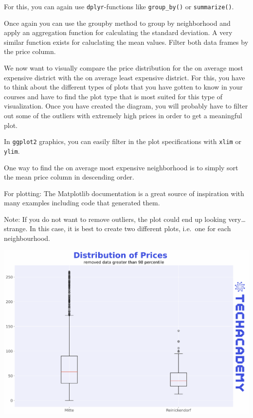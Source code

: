 \documentclass[
  11pt,
]{article}
\newenvironment{tips}[1]
  {
  \begin{itemize}
  \footnotesize
  \renewcommand{\labelitemi}{
    \raisebox{-.7\height}[0pt][0pt]{
      {\setkeys{Gin}{width=3em,keepaspectratio}
        \texttt{[image: images/\#1.png]}}
    }
  }
  \setlength{\fboxsep}{1em}
  \begin{rbox}
  \item
  }
  {
  \end{rbox}
  \end{itemize}
  }
\newenvironment{tipsp}[1]
  {
  \begin{itemize}
  \footnotesize
  \renewcommand{\labelitemi}{
    \raisebox{-.7\height}[0pt][0pt]{
      {\setkeys{Gin}{width=3em,keepaspectratio}
        \texttt{[image: images/\#1.png]}}
    }
  }
  \setlength{\fboxsep}{1em}
  \begin{pbox}
  \item
  }
  {
  \end{pbox}
  \end{itemize}
  }
\begin{document}
\begin{tips}r
For this, you can again use \texttt{dplyr}-functions like \texttt{group\_by()} or \texttt{summarize()}.

\end{tips}

\begin{tipsp}p
Once again you can use the groupby method to group by neighborhood and apply an aggregation function for calculating the standard deviation. A very similar function exists for caluclating the mean values. Filter both data frames by the price column.

\end{tipsp}

We now want to visually compare the price distribution for the on average most expensive district with the on average least expensive district. For this, you have to think about the different types of plots that you have gotten to know in your courses and have to find the plot type that is most suited for this type of visualization. Once you have created the diagram, you will probably have to filter out some of the outliers with extremely high prices in order to get a meaningful plot.

\begin{tips}r
In \texttt{ggplot2} graphics, you can easily filter in the plot specifications with \texttt{xlim} or \texttt{ylim}.

\end{tips}

\begin{tipsp}p
One way to find the on average most expensive neighborhood is to simply sort the mean price column in descending order.

For plotting: The Matplotlib documentation is a great source of inspiration with many examples including code that generated them.

Note: If you do not want to remove outliers, the plot could end up looking very\ldots{} strange. In this case, it is best to create two different plots, i.e.~one for each neighbourhood.

\end{tipsp}

\begin{center}\includegraphics[width=1\linewidth]{plot/01_python/box_plots} \end{center}
\end{document}
